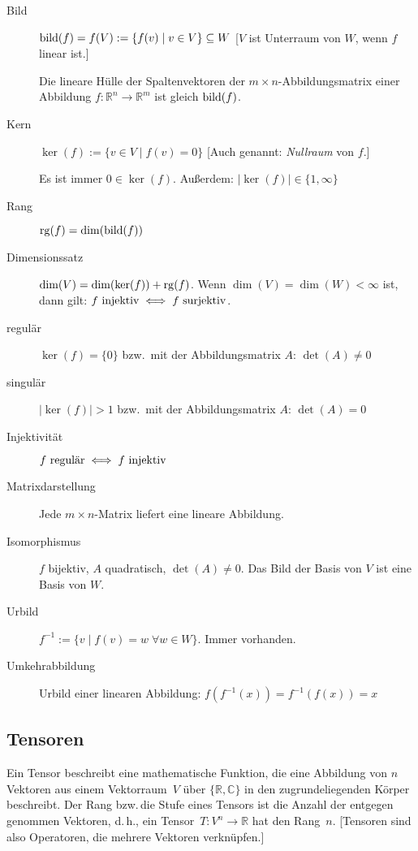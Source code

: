 \begin{description}
  \item [{Bild}] 
	$\operatorname{bild}(f) = f(V) := \{ f(v) \mid v \in V \} \subseteq W$
	[$V$ ist Unterraum von $W$, wenn $f$ linear ist.]

	Die lineare Hülle der Spaltenvektoren der $m\times n$-Abbildungsmatrix einer Abbildung $f:\mathbb{R}^{n}\to\mathbb{R}^{m}$ ist gleich $\operatorname{bild}(f)$.
  \item [{Kern}] 
	$\ker(f):=\{ v\in V \mid f(v)=0 \}$
    [Auch genannt: \emph{Nullraum} von $f$.]
    
    Es ist immer $0\in\ker(f)$.
	Außerdem: $\lvert \ker(f) \rvert \in \{ 1,\infty\} $
  \item [{Rang}] 
	$\operatorname{rg}(f)=\dim(\operatorname{bild}(f))$
  \item [{Dimensionssatz}] 
	$\dim(V)=\dim(\ker(f))+\operatorname{rg}(f)$.
    Wenn $\dim(V)=\dim(W)<\infty$ ist, dann gilt: $f \hbox{ injektiv} \iff f \hbox{ surjektiv}$.
  \item [{regulär}] 
	$\ker(f)=\{0\}$ bzw.~mit der Abbildungsmatrix $A$: $\det(A)\neq0$
  \item [{singulär}] 
	$\lvert \ker(f) \rvert > 1$ bzw.~mit der Abbildungsmatrix $A$: $\det(A)=0$
  \item [{Injektivität}]
	$f \hbox{ regulär} \iff f \hbox{ injektiv}$
  \item [{Matrixdarstellung}]
	Jede $m\times n$-Matrix liefert eine lineare Abbildung.
  \item [{Isomorphismus}]
	$f$ bijektiv, $A$ quadratisch, $\det(A)\neq0$. Das Bild der Basis von $V$ ist eine Basis von $W$.
  \item [{Urbild}] 
	$f^{-1}:=\{ v \mid f(v)=w\;\forall w\in W\} $. Immer vorhanden.
  \item [{Umkehrabbildung}] 
	Urbild einer linearen Abbildung: $f(f^{-1}(x))=f^{-1}(f(x))=x$
\end{description}

\subsection{Tensoren}
Ein Tensor beschreibt eine mathematische Funktion, die eine Abbildung von $n$ Vektoren aus einem Vektorraum~$V$ über $\{\mathbb{R}, \mathbb{C}\}$ in den zugrundeliegenden Körper beschreibt. Der Rang bzw.\,die Stufe eines Tensors ist die Anzahl der entgegen genommen Vektoren, d.\,h., ein Tensor~$T : V^n \to \mathbb{R}$ hat den Rang~$n$. [Tensoren sind also Operatoren, die mehrere Vektoren verknüpfen.]

